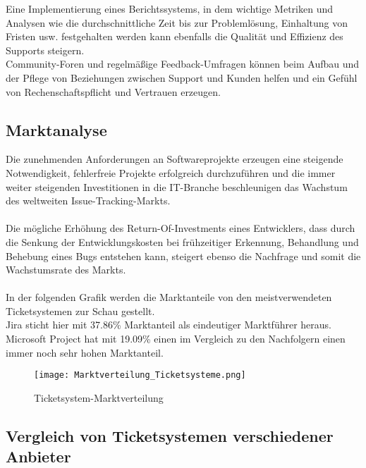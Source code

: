 Eine Implementierung eines Berichtssystems, in dem wichtige Metriken und Analysen wie die durchschnittliche Zeit bis zur Problemlösung, Einhaltung von Fristen usw. festgehalten werden kann ebenfalls die Qualität und Effizienz des Supports steigern. \\
Community-Foren und regelmäßige Feedback-Umfragen können beim Aufbau und der Pflege von Beziehungen zwischen Support und Kunden helfen und ein Gefühl von Rechenschaftspflicht und Vertrauen erzeugen. \\

  \newpage

  \subsection{Marktanalyse}
  
  Die zunehmenden Anforderungen an Softwareprojekte erzeugen eine steigende Notwendigkeit, fehlerfreie Projekte erfolgreich durchzuführen und die immer weiter steigenden Investitionen in die IT-Branche beschleunigen das Wachstum des weltweiten Issue-Tracking-Markts. \\\\
Die mögliche Erhöhung des Return-Of-Investments eines Entwicklers, dass durch die Senkung der Entwicklungskosten bei frühzeitiger Erkennung, Behandlung und Behebung eines Bugs entstehen kann, steigert ebenso die Nachfrage und somit die Wachstumsrate des Markts. \\\\
In der folgenden Grafik werden die Marktanteile von den meistverwendeten Ticketsystemen zur Schau gestellt. \\
Jira sticht hier mit 37.86\% Marktanteil als eindeutiger Marktführer heraus. Microsoft Project hat mit 19.09\% einen im Vergleich zu den Nachfolgern einen immer noch sehr hohen Marktanteil. \\

	 \begin{center}
			\begin{figure}[h]
   		\centering
    	\texttt{[image: Marktverteilung\_Ticketsysteme.png]}
		   \caption{Ticketsystem-Marktverteilung}
			\end{figure}
		\end{center}
		
		\newpage
    
  \subsection{Vergleich von Ticketsystemen verschiedener Anbieter}
  

